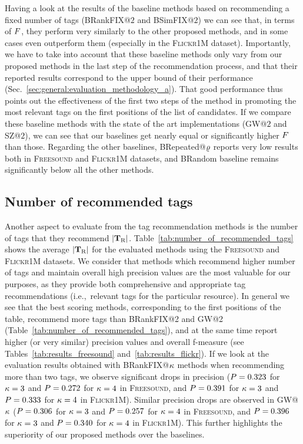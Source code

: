 Having a look at the results of the baseline methods based on recommending a fixed number of tags (BRankFIX@$2$ and BSimFIX@$2$) we can see that, in terms of $F$, they perform very similarly to the other proposed methods, and in some cases even outperform them (especially in the \textsc{Flickr1M} dataset). Importantly, we have to take into account that these baseline methods only vary from our proposed methods in the last step of the recommendation process, and that their reported results correspond to the upper bound of their performance (Sec.~\ref{sec:general:evaluation_methodology_a}). 
That good performance thus points out the effectiveness of the first two steps of the method in promoting the most relevant tags on the first positions of the list of candidates. If we compare these baseline methods with the state of the art implementations (GW@$2$ and SZ@$2$), we can see that our baselines get nearly equal or significantly higher $F$ than those.
Regarding the other baselines, BRepeated@$\varrho$ reports very low results both in \textsc{Freesound} and \textsc{Flickr1M} datasets, and BRandom baseline remains significantly below all the other methods.


\subsection{Number of recommended tags}

Another aspect to evaluate from the tag recommendation methods is the number of tags that they recommend $|\mathbf{T}_{\text{R}}|$. 
Table~\ref{tab:number_of_recommended_tags} shows the average $|\mathbf{T}_{\text{R}}|$ for the evaluated methods using the \textsc{Freesound} and \textsc{Flickr1M} datasets. We consider that methods which recommend higher number of tags and maintain overall high precision values are the most valuable for our purposes, as they provide both comprehensive and appropriate tag recommendations (i.e.,~relevant tags for the particular resource). 
In general we see that the best scoring methods, corresponding to the first positions of the table, recommend more tags than BRankFIX@2 and GW@2 (Table~\ref{tab:number_of_recommended_tags}), and at the same time report higher (or very similar) precision values and overall f-measure (see Tables~\ref{tab:results_freesound} and~\ref{tab:results_flickr}). If we look at the evaluation results obtained with BRankFIX@$\kappa$ methods when recommending more than two tags, we observe significant drops in precision ($P=0.323$ for $\kappa=3$ and $P=0.272$ for $\kappa=4$ in \textsc{Freesound}, and $P=0.391$ for $\kappa=3$ and $P=0.333$ for $\kappa=4$ in \textsc{Flickr1M}). Similar precision drops are observed in GW@$\kappa$ ($P=0.306$ for $\kappa=3$ and $P=0.257$ for $\kappa=4$ in \textsc{Freesound}, and $P=0.396$ for $\kappa=3$ and $P=0.340$ for $\kappa=4$ in \textsc{Flickr1M}).
This further highlights the superiority of our proposed methods over the baselines.


